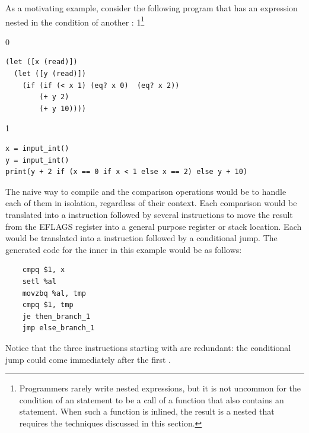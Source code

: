 \documentclass[7x10]{TimesAPriori_MIT}%
\def\racketEd{0}
\def\pythonEd{1}
\def\edition{0}
\newcommand{\python}[1]{{\if\edition\pythonEd #1\fi}}
\numberwithin{theorem}{chapter}
\numberwithin{definition}{chapter}
\numberwithin{equation}{chapter}
\begin{document}
As a motivating example, consider the following program that has an
 expression nested in the condition of another :%
\python{\footnote{Programmers rarely write nested 
  expressions, but it is not uncommon for the condition of an
  \code{if} statement to be a call of a function that also contains an
  \code{if} statement.  When such a function is inlined, the result is
  a nested \code{if} that requires the techniques discussed in this
  section.}}
\begin{center}
\begin{minipage}{0.96\textwidth}
{\if\edition\racketEd        
\begin{lstlisting}
(let ([x (read)])
  (let ([y (read)])
    (if (if (< x 1) (eq? x 0)  (eq? x 2))
        (+ y 2)
        (+ y 10))))
\end{lstlisting}
\fi}
{\if\edition\pythonEd
\begin{lstlisting}
x = input_int()
y = input_int()
print(y + 2 if (x == 0 if x < 1 else x == 2) else y + 10)
\end{lstlisting}
\fi}
\end{minipage}
\end{center}
%
The naive way to compile  and the comparison operations would
be to handle each of them in isolation, regardless of their context.
Each comparison would be translated into a  instruction
followed by several instructions to move the result from the EFLAGS
register into a general purpose register or stack location. Each
 would be translated into a  instruction followed by
a conditional jump. The generated code for the inner  in this
example would be as follows:
\begin{center}
\begin{minipage}{0.96\textwidth}
\begin{lstlisting}
    cmpq $1, x
    setl %al
    movzbq %al, tmp
    cmpq $1, tmp
    je then_branch_1
    jmp else_branch_1
\end{lstlisting}
\end{minipage}
\end{center}
Notice that the three instructions starting with  are
redundant: the conditional jump could come immediately after the first
. 
\end{document}
